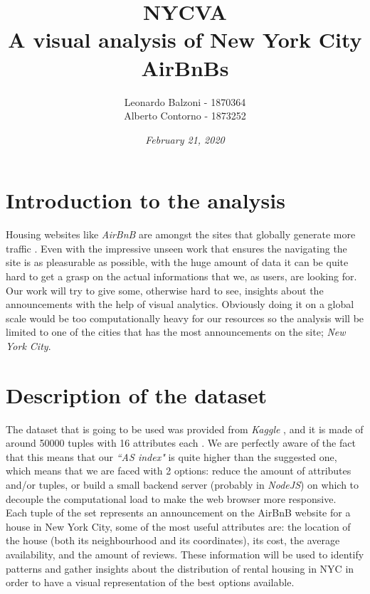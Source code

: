 \documentclass[11pt]{article}
\title{\bigskip \Large {\bf NYCVA \\ A visual analysis of New York City AirBnBs}}
\date{\em February 21, 2020}
\author{Leonardo Balzoni - 1870364 \\ Alberto Contorno - 1873252}
\begin{document}
\maketitle
\newpage


\section{Introduction to the analysis}
Housing websites like {\em AirBnB} \cite{ABNB} are amongst the sites that globally generate more traffic \cite{ABNBTRAFFIC}. Even with the impressive unseen work that ensures the navigating the site is as pleasurable as possible, with the huge amount of data it can be quite hard to get a grasp on the actual informations that we, as users, are looking for. Our work will try to give some, otherwise hard to see, insights about the announcements with the help of visual analytics. Obviously doing it on a global scale would be too computationally heavy for our resources so the analysis will be limited to one of the cities that has the most announcements on the site; {\em New York City}.

\section{Description of the dataset}
The dataset that is going to be used was provided from {\em Kaggle} \cite{KAGGLE}, and it is made of around 50000 tuples with 16 attributes each \cite{NYCDATASET}. We are perfectly aware of the fact that this means that our {\em ``AS index"} is quite higher than the suggested one, which means that we are faced with 2 options: reduce the amount of attributes and/or tuples, or build a small backend server (probably in {\em NodeJS}) on which to decouple the computational load to make the web browser more responsive.\\
Each tuple of the set represents an announcement on the AirBnB website for a house in New York City, some of the most useful attributes are: the location of the house (both its neighbourhood and its coordinates), its cost, the average availability, and the amount of reviews. These information will be used to identify patterns and gather insights about the distribution of rental housing in NYC in order to have a visual representation of the best options available.
\end{document}
